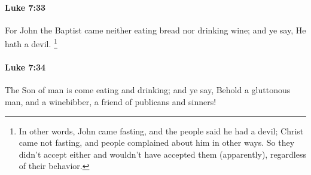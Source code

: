 		\paragraph{Luke 7:33} %
			\label{LUKE-7-33}

			For John the Baptist came neither eating bread nor drinking wine; and ye say, He hath a devil.%
				\footnote{%
					In other words, John came fasting, and the people said he had a devil; Christ came not fasting, and people complained about him in other ways. So they didn't accept either and wouldn't have accepted them (apparently), regardless of their behavior.
					}

			\begin{framed}
			\scriptsize
				\begin{compactdesc}
					\item[SBLG] 
				\end{compactdesc}
			\end{framed}

		\paragraph{Luke 7:34} %
			\label{LUKE-7-34}

			The Son of man is come eating and drinking; and ye say, Behold a gluttonous man, and a winebibber, a friend of publicans and sinners!

